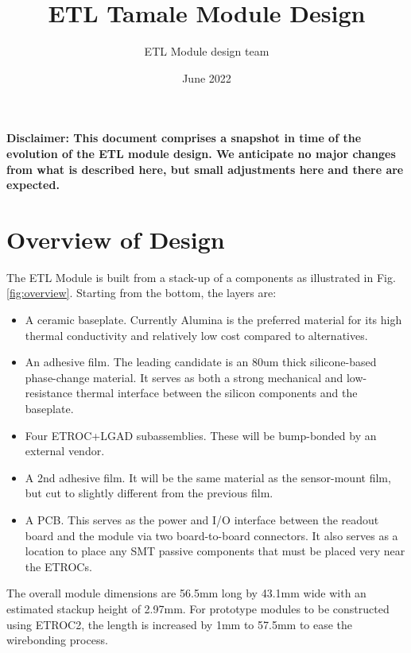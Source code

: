 \documentclass[10pt]{datasheet}
\title{ETL Tamale Module Design}
\author{ETL Module design team}
\date{June 2022}
\begin{document}
\maketitle


\onecolumn

\begin{versionhistory}
\end{versionhistory}

\begin{Large}
	\textbf{
    Disclaimer: This document comprises a snapshot in time of the evolution of the ETL module design. We anticipate no major changes from what is described here, but small adjustments here and there are expected.}
\end{Large}

\section{Overview of Design}

The ETL Module is built from a stack-up of a components as illustrated in Fig. \ref{fig:overview}. Starting from the bottom, the layers are:

\begin{itemize}
	\item A ceramic baseplate. Currently Alumina is the preferred material for its high thermal conductivity and relatively low cost compared to alternatives.
	\item An adhesive film. The leading candidate is an 80um thick silicone-based phase-change material. It serves as both a strong mechanical and low-resistance thermal interface between the silicon components and the baseplate.
	\item Four ETROC+LGAD subassemblies. These will be bump-bonded by an external vendor.
	\item A 2nd adhesive film. It will be the same material as the sensor-mount film, but cut to slightly different from the previous film.
	\item A PCB. This serves as the power and I/O interface between the readout board and the module via two board-to-board connectors. It also serves as a location to place any SMT passive components that must be placed very near the ETROCs.
\end{itemize}

The overall module dimensions are 56.5mm long by 43.1mm wide with an estimated stackup height of 2.97mm. For prototype modules to be constructed using ETROC2, the length is increased by 1mm to 57.5mm to ease the wirebonding process.
\end{document}
